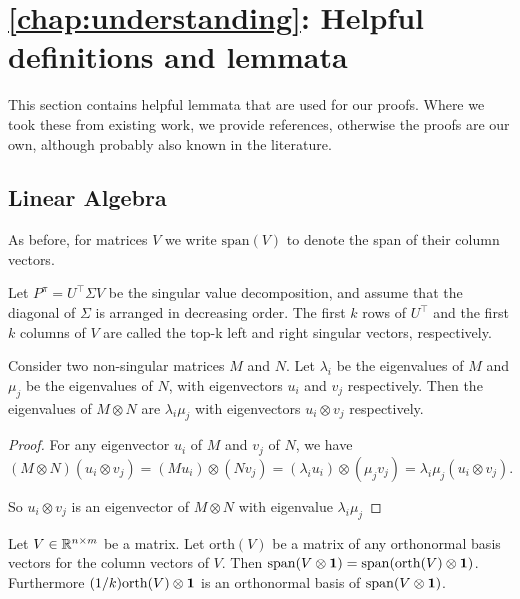 \section{\autoref{chap:understanding}: Helpful definitions and lemmata}
\label{app:formal:understanding}

This section contains helpful lemmata that are used for our proofs.
Where we took these from existing work, we provide references, otherwise the proofs are our own, although probably also known in the literature.

\subsection{Linear Algebra}
\label{app:linalg}

As before, for matrices $V$ we write $\mathrm{span}(V)$ to denote the span of their column vectors. 

\begin{definition}\label{def:topk-single}
Let $P^\pi = U^\top \Sigma V$ be the singular value decomposition, and assume that the diagonal of $\Sigma$ is arranged in decreasing order.
The first $k$ rows of $U^\top$ and the first $k$ columns of $V$ are called the top-k left and right singular vectors, respectively.
\end{definition}

\begin{lemma}\label{lem:spectrum_kronecker}
    Consider two non-singular matrices $M$ and $N$. Let $\lambda_i$ be the eigenvalues of $M$ and $\mu_j$ be the eigenvalues of $N$, with eigenvectors $u_i$ and $v_j$ respectively. Then the eigenvalues of $M\otimes N$ are $\lambda_i\mu_j$ with eigenvectors $u_i \otimes v_j$ respectively.
\end{lemma}

\begin{proof}
For any eigenvector $u_i$ of $M$ and $v_j$ of $N$, we have
    $$\left(M\otimes N\right) \left(u_i \otimes v_j\right) = \left(M u_i\right) \otimes \left(N v_j\right) = \left(\lambda_i u_i\right)\otimes\left(\mu_j v_j\right) = \lambda_i\mu_j \left(u_i \otimes v_j\right).$$

    So $u_i\otimes v_j$ is an eigenvector of $M\otimes N$ with eigenvalue $\lambda_i \mu_j$
\end{proof}

\begin{lemma}\label{lem:orth_kronecker}
    Let $V \in \mathbb{R}^{n \times m}$ be a matrix. Let $\mathrm{orth}(V)$ be a matrix of any orthonormal basis vectors for the column vectors of $V$. Then $\mathrm{span}(V\otimes {\bm{1}}) = \mathrm{span}(\mathrm{orth}(V) \otimes {\bm{1}})$. Furthermore $(1/k) \mathrm{orth}(V) \otimes {\bm{1}}$ is an orthonormal basis of $\mathrm{span}(V \otimes {\bm{1}})$.
\end{lemma}

